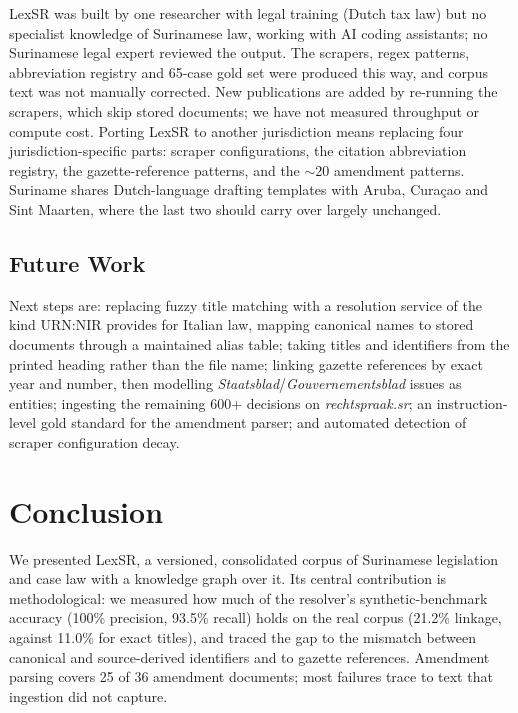 \documentclass{IOS-Book-Article}
\begin{document}
LexSR was built by one researcher with legal training (Dutch tax law) but no specialist
knowledge of Surinamese law, working with AI coding assistants; no Surinamese legal expert
reviewed the output. The scrapers, regex patterns, abbreviation registry and 65-case gold
set were produced this way, and corpus text was not manually corrected. New publications
are added by re-running the scrapers, which skip stored documents; we have not measured
throughput or compute cost. Porting LexSR to another
jurisdiction means replacing four jurisdiction-specific parts: scraper configurations, the
citation abbreviation registry, the gazette-reference patterns, and the $\sim$20 amendment
patterns. Suriname shares Dutch-language drafting templates with Aruba, Cura\c{c}ao and
Sint Maarten, where the last two should carry over largely unchanged.

\subsection{Future Work}
\label{sec:future}

Next steps are: replacing fuzzy title matching with a resolution service of the kind
URN:NIR provides for Italian law, mapping canonical names to stored documents through a
maintained alias table; taking titles and identifiers from the printed heading rather than
the file name; linking gazette references by exact year and number, then modelling
\emph{Staatsblad}/\emph{Gouvernementsblad} issues as entities; ingesting the remaining 600+
decisions on \emph{rechtspraak.sr}; an instruction-level gold standard for the amendment
parser; and automated detection of scraper configuration decay.

\section{Conclusion}
\label{sec:conclusion}

We presented LexSR, a versioned, consolidated corpus of Surinamese legislation and case law
with a knowledge graph over it. Its central contribution is methodological: we measured how
much of the resolver's synthetic-benchmark accuracy (100\% precision, 93.5\% recall) holds on
the real corpus (21.2\% linkage, against 11.0\% for exact titles), and traced the gap to the
mismatch between canonical and source-derived identifiers and to gazette references. Amendment parsing covers 25 of 36 amendment
documents; most failures trace to text that ingestion did not capture.
\end{document}
